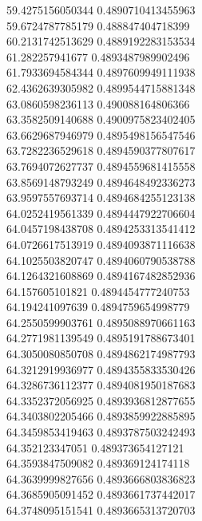 {59.4275156050344 0.4890710413455963
 \\
59.6724787785179 0.488847404718399
 \\
60.2131742513629 0.4889192283153534
 \\
61.282257941677 0.4893487989902496
 \\
61.7933694584344 0.4897609949111938
 \\
62.4362639305982 0.4899544715881348
 \\
63.0860598236113 0.490088164806366
 \\
63.3582509140688 0.4900975823402405
 \\
63.6629687946979 0.4895498156547546
 \\
63.7282236529618 0.4894590377807617
 \\
63.7694072627737 0.4894559681415558
 \\
63.8569148793249 0.4894648492336273
 \\
63.9597557693714 0.4894684255123138
 \\
64.0252419561339 0.4894447922706604
 \\
64.0457198438708 0.4894253313541412
 \\
64.0726617513919 0.4894093871116638
 \\
64.1025503820747 0.4894060790538788
 \\
64.1264321608869 0.4894167482852936
 \\
64.157605101821 0.4894454777240753
 \\
64.194241097639 0.4894759654998779
 \\
64.2550599903761 0.4895088970661163
 \\
64.2771981139549 0.4895191788673401
 \\
64.3050080850708 0.4894862174987793
 \\
64.3212919936977 0.4894355833530426
 \\
64.3286736112377 0.4894081950187683
 \\
64.3352372056925 0.4893936812877655
 \\
64.3403802205466 0.4893859922885895
 \\
64.3459853419463 0.4893787503242493
 \\
64.352123347051 0.489373654127121
 \\
64.3593847509082 0.489369124174118
 \\
64.3639999827656 0.4893666803836823
 \\
64.3685905091452 0.4893661737442017
 \\
64.3748095151541 0.4893665313720703
 \\
}
